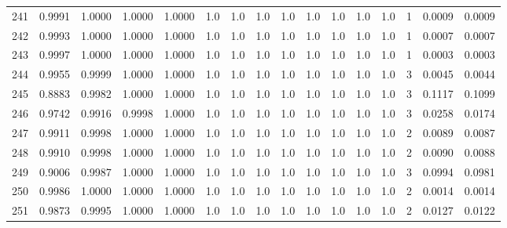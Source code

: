 \begin{tabular}{lrrrrrrrrrrrrrrr}
241 &      0.9991 &  1.0000 &  1.0000 &  1.0000 &     1.0 &     1.0 &     1.0 &     1.0 &     1.0 &     1.0 &      1.0 &        1.0 &      1 &                    0.0009 &                     0.0009 \\
242 &      0.9993 &  1.0000 &  1.0000 &  1.0000 &     1.0 &     1.0 &     1.0 &     1.0 &     1.0 &     1.0 &      1.0 &        1.0 &      1 &                    0.0007 &                     0.0007 \\
243 &      0.9997 &  1.0000 &  1.0000 &  1.0000 &     1.0 &     1.0 &     1.0 &     1.0 &     1.0 &     1.0 &      1.0 &        1.0 &      1 &                    0.0003 &                     0.0003 \\
244 &      0.9955 &  0.9999 &  1.0000 &  1.0000 &     1.0 &     1.0 &     1.0 &     1.0 &     1.0 &     1.0 &      1.0 &        1.0 &      3 &                    0.0045 &                     0.0044 \\
245 &      0.8883 &  0.9982 &  1.0000 &  1.0000 &     1.0 &     1.0 &     1.0 &     1.0 &     1.0 &     1.0 &      1.0 &        1.0 &      3 &                    0.1117 &                     0.1099 \\
246 &      0.9742 &  0.9916 &  0.9998 &  1.0000 &     1.0 &     1.0 &     1.0 &     1.0 &     1.0 &     1.0 &      1.0 &        1.0 &      3 &                    0.0258 &                     0.0174 \\
247 &      0.9911 &  0.9998 &  1.0000 &  1.0000 &     1.0 &     1.0 &     1.0 &     1.0 &     1.0 &     1.0 &      1.0 &        1.0 &      2 &                    0.0089 &                     0.0087 \\
248 &      0.9910 &  0.9998 &  1.0000 &  1.0000 &     1.0 &     1.0 &     1.0 &     1.0 &     1.0 &     1.0 &      1.0 &        1.0 &      2 &                    0.0090 &                     0.0088 \\
249 &      0.9006 &  0.9987 &  1.0000 &  1.0000 &     1.0 &     1.0 &     1.0 &     1.0 &     1.0 &     1.0 &      1.0 &        1.0 &      3 &                    0.0994 &                     0.0981 \\
250 &      0.9986 &  1.0000 &  1.0000 &  1.0000 &     1.0 &     1.0 &     1.0 &     1.0 &     1.0 &     1.0 &      1.0 &        1.0 &      2 &                    0.0014 &                     0.0014 \\
251 &      0.9873 &  0.9995 &  1.0000 &  1.0000 &     1.0 &     1.0 &     1.0 &     1.0 &     1.0 &     1.0 &      1.0 &        1.0 &      2 &                    0.0127 &                     0.0122 \\

\end{tabular}
